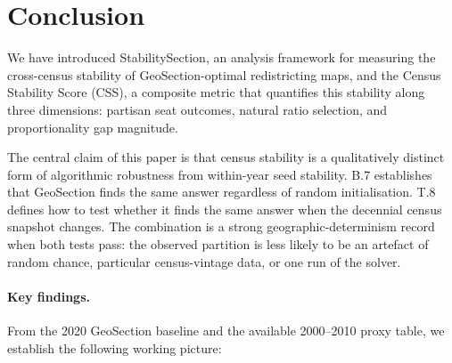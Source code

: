 \section{Conclusion}
\label{sec:conclusion}

We have introduced StabilitySection, an analysis framework for measuring the
cross-census stability of GeoSection-optimal redistricting maps, and the
Census Stability Score (CSS), a composite metric that quantifies this stability
along three dimensions: partisan seat outcomes, natural ratio selection, and
proportionality gap magnitude.

The central claim of this paper is that census stability is a qualitatively
distinct form of algorithmic robustness from within-year seed stability.
B.7 establishes that GeoSection finds the same answer regardless of random
initialisation.
T.8 defines how to test whether it finds the same answer when the decennial
census snapshot changes.
The combination is a strong geographic-determinism record when both tests pass:
the observed partition is less likely to be an artefact of random chance,
particular census-vintage data, or one run of the solver.

\paragraph{Key findings.}
From the 2020 GeoSection baseline and the available 2000--2010 proxy table, we
establish the following working picture:

